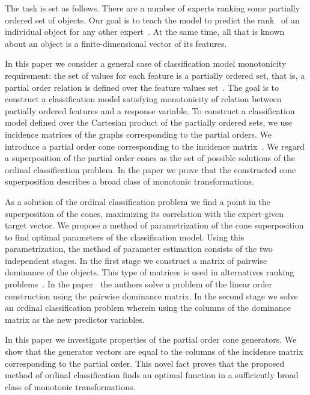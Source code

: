 \documentclass[12pt,preprint]{elsarticle}
\begin{document}
The task is set as follows. There are a number of experts ranking some partially ordered set of objects. Our goal is to teach the model to predict the rank~\cite{Nadia2020} of an individual object for any other expert~\cite{Elena2023}. At the same time, all that is known about an object is a finite-dimensional vector of its features. 

In this paper we consider a general case of classification model monotonicity requirement: the set of values for each feature is a partially ordered set, that is, a partial order relation is defined over the feature values set~\cite{Cheng2010}. The goal is to construct a classification model satisfying monotonicity of relation between partially ordered features and a response variable. To construct a classification model defined over the Cartesian product of the partially ordered sets, we use incidence matrices of the graphs corresponding to the partial orders. We introduce a partial order cone corresponding to the incidence matrix~\cite{Kuznetsov2014, Dehnokhalaji2011256}. We regard a superposition of the partial order cones as the set of possible solutions of the ordinal classification problem. In the paper we prove that the constructed cone superposition describes a broad class of monotonic transformations.

As a solution of the ordinal classification problem we find a point in the superposition of the cones, maximizing its correlation with the expert-given target vector. We propose a method of parametrization of the cone superposition to find optimal parameters of the classification model. Using this parametrization, the method of parameter estimation consists of the two independent stages. In the first stage we construct a matrix of pairwise dominance of the objects. This type of matrices is used in alternatives ranking problems~\cite{Kaci2011,Busa-Fekete2013}. In the paper~\cite{Cohen1999} the authors solve a problem of the linear order construction using the pairwise dominance matrix. In the second stage we solve an ordinal classification problem wherein using the columns of the dominance matrix as the new predictor variables.

In this paper we investigate properties of the partial order cone generators. We show that the generator vectors are equal to the columns of the incidence matrix corresponding to the partial order. This novel fact proves that the proposed method of ordinal classification finds an optimal function in a sufficiently broad class of monotonic transformations.
\end{document}
